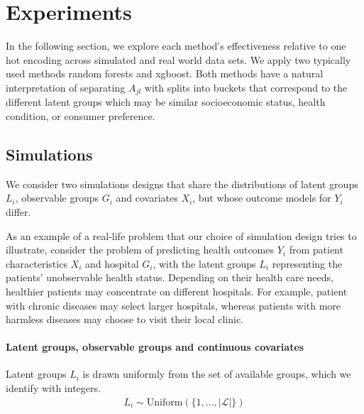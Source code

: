 \documentclass{article}
\theoremstyle{plain}
\theoremstyle{definition}
\theoremstyle{remark}
\begin{document}
\section{Experiments}

In the following section, we explore each method's effectiveness relative to one hot encoding across simulated and real world data sets. We apply two typically used methods random forests and xgboost. Both methods have a natural interpretation of separating $A_{jl}$ with splits into buckets that correspond to the different latent groups which may be similar socioeconomic status, health condition, or consumer preference.

\subsection{Simulations}
\label{sec:simulations}

We consider two simulations designs that share the distributions of latent groups $L_{i}$, observable groups $G_{i}$ and covariates $X_{i}$, but whose outcome models for $Y_{i}$ differ.

As an example of a real-life problem that our choice of simulation design tries to illustrate, consider the problem of predicting health outcomes $Y_{i}$ from patient characteristics $X_{i}$ and hospital $G_{i}$, with the latent groups $L_{i}$ representing the patients' unobservable health status. Depending on their health care needs, healthier patients may concentrate on different hospitals. For example, patient with chronic diseases may select larger hospitals, whereas patients with more harmless diseases may choose to visit their local clinic.

\paragraph{Latent groups, observable groups and continuous covariates} Latent groups $L_{i}$ is drawn uniformly from the set of available groups, which we identify with integers.
\begin{align}
    L_{i} \sim \text{Uniform}(\{1,...,|\mathcal{L}|\})
    \label{eq:latent_groups}
\end{align}
\end{document}
